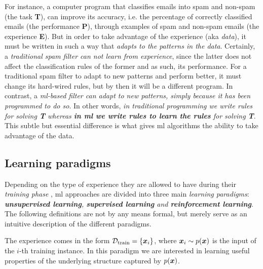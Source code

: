 For instance, a computer program that classifies emails into
spam and non-spam (the task \textbf{T}), can improve its accuracy, i.e. the
percentage of correctly classified emails (the performance \textbf{P}), through
examples of spam and non-spam emails (the experience \textbf{E}). But in order
to take advantage of the experience (aka \emph{data}), it must be written
in such a way that \emph{adapts to the patterns in the data}. Certainly, a
\emph{traditional spam filter can not learn from experience}, since the latter
does not affect the classification rules of the former and as such, its
performance. For a traditional spam filter to adapt to new patterns and perform
better, it must change its hard-wired rules, but by then it will be a different
program. In contrast, a \emph{\gls{ml}-based filter can adapt to new patterns,
simply because it has been programmed to do so}. In other words, \emph{in
traditional programming we write rules for
solving \textbf{T} whereas \textbf{in \gls{ml} we write rules to learn the
rules} for solving \textbf{T}}. This subtle but essential difference is what
gives \gls{ml} algorithms the ability to take advantage of the data.

\subsection{Learning paradigms}

Depending on the type of experience they are allowed to have during their
\emph{training phase} \parencite{deeplearning}, \gls{ml} approaches are divided
into three main \emph{learning paradigms}:
\emph{\textbf{unsupervised learning}, \textbf{supervised learning} and \textbf{reinforcement learning}}. The following definitions are not by any
means formal, but merely serve as an intuitive description of the different
paradigms.

\begin{definition}[name=Unsupervised learning]
	The experience comes in the form $\mathcal{D}_\text{train} = \{\boldsymbol{x}_i\}$, where $\boldsymbol{x}_i \sim
	p(\boldsymbol{x})$ is the input of the $i$-th training instance. In this paradigm we are interested in learning useful properties
	of the underlying structure captured by $p(\boldsymbol{x})$.
\end{definition}

